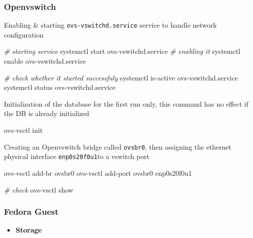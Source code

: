 \documentclass[
  14pt,
  english,
  a4paper,
]{scrreprt}
\newenvironment{Shaded}{}{}
\newcommand{\CommentTok}[1]{\textcolor[rgb]{0.38,0.63,0.69}{\textit{#1}}}
\newcommand{\ExtensionTok}[1]{#1}
\newcommand{\NormalTok}[1]{#1}
\providecommand{\tightlist}{%
  \setlength{\itemsep}{0pt}\setlength{\parskip}{0pt}}
\begin{document}
\hypertarget{openvswitch-1}{%
\subsubsection{Openvswitch}\label{openvswitch-1}}

Enabling \& starting \texttt{ovs-vswitchd.service} service to handle
network configuration

\begin{Shaded}
\begin{Highlighting}[]
\CommentTok{\# starting service}
\ExtensionTok{systemctl}\NormalTok{ start ovs{-}vswitchd.service}
\CommentTok{\# enabling it}
\ExtensionTok{systemctl}\NormalTok{ enable ovs{-}vswitchd.service}

\CommentTok{\# check whether it started successfuly}
\ExtensionTok{systemctl}\NormalTok{ is{-}active ovs{-}vswitchd.service}
\ExtensionTok{systemctl}\NormalTok{ status ovs{-}vswitchd.service}
\end{Highlighting}
\end{Shaded}

Initialization of the database for the first run only, this command has
no effect if the DB is already initialized

\begin{Shaded}
\begin{Highlighting}[]
\ExtensionTok{ovs{-}vsctl}\NormalTok{ init}
\end{Highlighting}
\end{Shaded}

Creating an Openvswitch bridge called \texttt{ovsbr0}, then assigning
the ethernet physical interface \texttt{enp0s20f0u1}to a vswitch port

\begin{Shaded}
\begin{Highlighting}[]
\ExtensionTok{ovs{-}vsctl}\NormalTok{ add{-}br ovsbr0}
\ExtensionTok{ovs{-}vsctl}\NormalTok{ add{-}port ovsbr0 enp0s20f0u1}

\CommentTok{\# check}
\ExtensionTok{ovs{-}vsctl}\NormalTok{ show}
\end{Highlighting}
\end{Shaded}

\hypertarget{fedora-guest}{%
\subsubsection{Fedora Guest}\label{fedora-guest}}

\begin{itemize}
\tightlist
\item
  \textbf{Storage}
\end{itemize}
\end{document}
